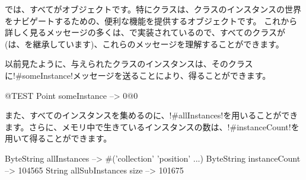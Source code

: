 \documentclass[a4paper,10pt,twoside]{book}
\begin{document}
\st{}では、すべてがオブジェクトです。特にクラスは、クラスのインスタンスの世界をナビゲートするための、便利な機能を提供するオブジェクトです。%
これから詳しく見るメッセージの多くは、で実装されているので、すべてのクラスが(は、を継承しています)、これらのメッセージを理解することができます。

以前見たように、与えられたクラスのインスタンスは、そのクラスに\ct!#someInstance!メッセージを送ることにより、得ることができます。%
\begin{code}{@TEST} %
Point someInstance --> 0@0
\end{code}

また、すべてのインスタンスを集めるのに、\ct!#allInstances!を用いることができます。さらに、メモリ中で生きているインスタンスの数は、\ct!#instanceCount!を用いて得ることができます。

\begin{code}{} %
ByteString allInstances        --> #('collection' 'position'  ...)
ByteString instanceCount    --> 104565
String allSubInstances size -->  101675
\end{code}
\end{document}
